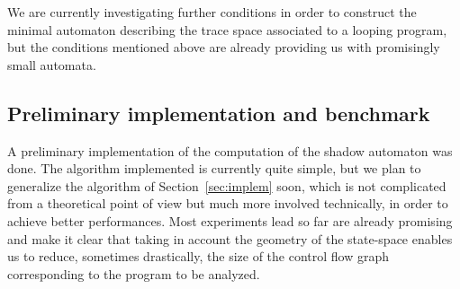 \documentclass[orivec]{llncs} \usepackage[T1]{fontenc}
\begin{document}
We are currently investigating further conditions in order to construct the
minimal automaton describing the trace space associated to a looping program,
but the conditions mentioned above are already providing us with promisingly
small automata.

\subsection{Preliminary implementation and benchmark}
\label{sec:loops-implem}
A preliminary implementation of the computation of the shadow automaton was
done. The algorithm implemented is currently quite simple, but we plan to
generalize the algorithm of Section~\ref{sec:implem} soon, which is not
complicated from a theoretical point of view but much more involved technically,
in order to achieve better performances. Most experiments lead so far are
already promising and make it clear that taking in account the geometry of the
state-space enables us to reduce, sometimes drastically, the size of the control
flow graph corresponding to the program to be analyzed.
\end{document}
